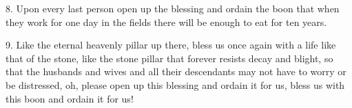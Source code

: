 8. Upon every last person open up the blessing and ordain the boon that when they
work for one day in the fields there will be enough to eat for ten years.

9. Like the eternal heavenly pillar up there, bless us once again with a life like
that of the stone, like the stone pillar that forever resists decay and blight,
so that the husbands and wives and all their descendants may not have to worry
or be distressed, oh, please open up this blessing and ordain it for us, bless
us with this boon and ordain it for us!

